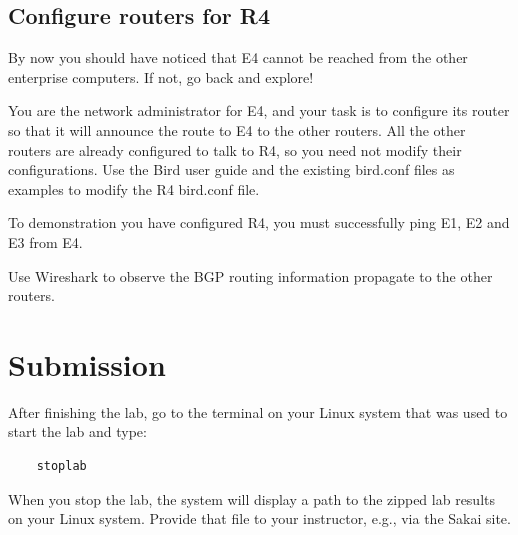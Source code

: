 \subsection{Configure routers for R4}
By now you should have noticed that E4 cannot be reached from the other enterprise computers.  If not, go back and 
explore!

You are the network administrator for E4, and your task is to configure its router so that it will announce
the route to E4 to the other routers.  All the other routers are already configured to talk to R4, so you need
not modify their configurations.    Use the Bird user guide and the existing bird.conf files as examples 
to modify the R4 bird.conf file.  

To demonstration you have configured R4, you must successfully ping E1, E2 and E3 from E4.

Use Wireshark to observe the BGP routing information propagate to the other routers.

\section{Submission}
After finishing the lab, go to the terminal on your Linux system that was used to start the lab and type:
\begin{verbatim}
    stoplab 
\end{verbatim}
When you stop the lab, the system will display a path to the zipped lab results on your Linux system.  Provide that file to 
your instructor, e.g., via the Sakai site.

\copyrightnotice


